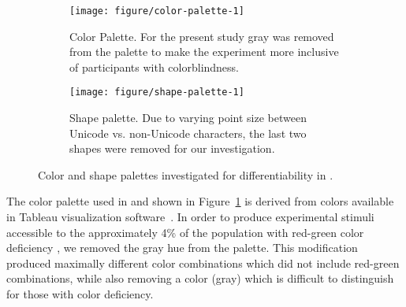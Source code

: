 \documentclass[12pt]{article}\usepackage[]{graphicx}\usepackage[]{color}
\newenvironment{knitrout}{}{} %
\begin{document}
\begin{figure}[bhtp]\centering
\begin{subfigure}[t]{0.475\textwidth}
\begin{knitrout}
\color{fgcolor}

{\centering \texttt{[image: figure/color-palette-1]} 

}



\end{knitrout}
\caption[Color palette used to maximize preattentive perception]{Color Palette. For the present study  gray was removed from the palette to make the experiment more inclusive of participants with colorblindness.\label{fig:colors}}
\end{subfigure}
\hfill
\begin{subfigure}[t]{0.475\textwidth}
\begin{knitrout}
\color{fgcolor}

{\centering \texttt{[image: figure/shape-palette-1]} 

}



\end{knitrout}
\caption[Shape palette used to maximize preattentive perception]{Shape palette. Due to varying point size between Unicode vs. non-Unicode characters, the last two shapes were removed for our investigation.\label{fig:shapes}}
\end{subfigure}
\caption{Color and shape palettes investigated for differentiability in \protect\citet{heer:2014}. }
\end{figure}

The color palette used in \citet{heer:2014} and shown in Figure~\ref{fig:colors} is derived from colors available in Tableau visualization software~\citep{tableau}. 
In order to produce experimental stimuli accessible to the approximately 4\% of the population with red-green color deficiency \citep{colorvision}, we removed the gray hue from the palette. This modification produced maximally different color combinations which did not include red-green combinations, while also removing a color (gray) which is difficult to distinguish for those with color deficiency.  
\end{document}
